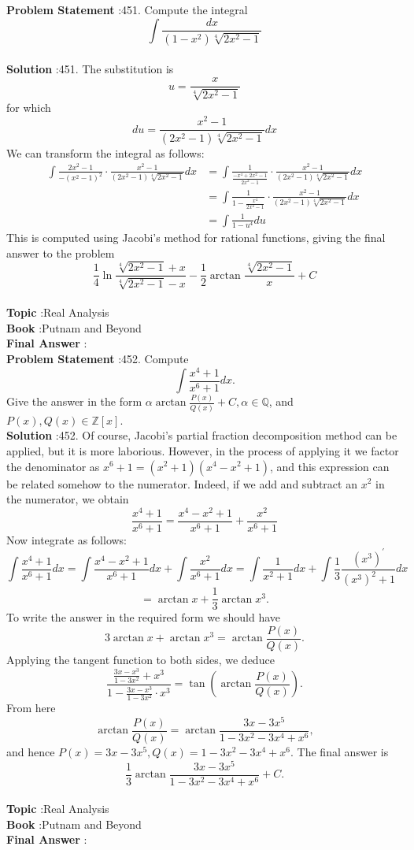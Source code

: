 \documentclass[10pt]{article}
\begin{document}
\textbf{Problem Statement} :451. Compute the integral$$ \int \frac{d x}{\left(1-x^{2}\right) \sqrt[4]{2 x^{2}-1}} $$\\
\textbf{Solution} :451. The substitution is$$ u=\frac{x}{\sqrt[4]{2 x^{2}-1}} $$for which$$ d u=\frac{x^{2}-1}{\left(2 x^{2}-1\right) \sqrt[4]{2 x^{2}-1}} d x $$We can transform the integral as follows:$$ \begin{aligned} \int \frac{2 x^{2}-1}{-\left(x^{2}-1\right)^{2}} \cdot \frac{x^{2}-1}{\left(2 x^{2}-1\right) \sqrt[4]{2 x^{2}-1}} d x &=\int \frac{1}{\frac{-x^{4}+2 x^{2}-1}{2 x^{2}-1}} \cdot \frac{x^{2}-1}{\left(2 x^{2}-1\right) \sqrt[4]{2 x^{2}-1}} d x \\ &=\int \frac{1}{1-\frac{x^{4}}{2 x^{2}-1}} \cdot \frac{x^{2}-1}{\left(2 x^{2}-1\right) \sqrt[4]{2 x^{2}-1}} d x \\ &=\int \frac{1}{1-u^{4}} d u \end{aligned} $$This is computed using Jacobi's method for rational functions, giving the final answer to the problem$$ \frac{1}{4} \ln \frac{\sqrt[4]{2 x^{2}-1}+x}{\sqrt[4]{2 x^{2}-1}-x}-\frac{1}{2} \arctan \frac{\sqrt[4]{2 x^{2}-1}}{x}+C $$\\
\textbf{Topic} :Real Analysis\\
\textbf{Book} :Putnam and Beyond\\
\textbf{Final Answer} :\\


\textbf{Problem Statement} :452. Compute$$ \int \frac{x^{4}+1}{x^{6}+1} d x . $$Give the answer in the form $\alpha \arctan \frac{P(x)}{Q(x)}+C, \alpha \in \mathbb{Q}$, and $P(x), Q(x) \in \mathbb{Z}[x]$. \\
\textbf{Solution} :452. Of course, Jacobi's partial fraction decomposition method can be applied, but it is more laborious. However, in the process of applying it we factor the denominator as $x^{6}+1=\left(x^{2}+1\right)\left(x^{4}-x^{2}+1\right)$, and this expression can be related somehow to the numerator. Indeed, if we add and subtract an $x^{2}$ in the numerator, we obtain$$ \frac{x^{4}+1}{x^{6}+1}=\frac{x^{4}-x^{2}+1}{x^{6}+1}+\frac{x^{2}}{x^{6}+1} $$Now integrate as follows:$$ \int \frac{x^{4}+1}{x^{6}+1} d x=\int \frac{x^{4}-x^{2}+1}{x^{6}+1} d x+\int \frac{x^{2}}{x^{6}+1} d x=\int \frac{1}{x^{2}+1} d x+\int \frac{1}{3} \frac{\left(x^{3}\right)^{\prime}}{\left(x^{3}\right)^{2}+1} d x $$$$ =\arctan x+\frac{1}{3} \arctan x^{3} . $$To write the answer in the required form we should have$$ 3 \arctan x+\arctan x^{3}=\arctan \frac{P(x)}{Q(x)} . $$Applying the tangent function to both sides, we deduce$$ \frac{\frac{3 x-x^{3}}{1-3 x^{2}}+x^{3}}{1-\frac{3 x-x^{3}}{1-3 x^{2}} \cdot x^{3}}=\tan \left(\arctan \frac{P(x)}{Q(x)}\right) . $$From here$$ \arctan \frac{P(x)}{Q(x)}=\arctan \frac{3 x-3 x^{5}}{1-3 x^{2}-3 x^{4}+x^{6}}, $$and hence $P(x)=3 x-3 x^{5}, Q(x)=1-3 x^{2}-3 x^{4}+x^{6}$. The final answer is$$ \frac{1}{3} \arctan \frac{3 x-3 x^{5}}{1-3 x^{2}-3 x^{4}+x^{6}}+C . $$\\
\textbf{Topic} :Real Analysis\\
\textbf{Book} :Putnam and Beyond\\
\textbf{Final Answer} :\\
\end{document}
